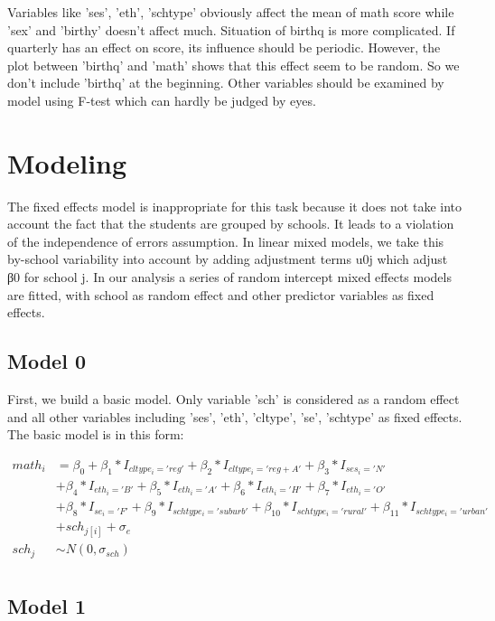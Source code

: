 \documentclass{article}
\begin{document}
Variables like 'ses', 'eth', 'schtype' obviously affect the mean of math score while 'sex' and 'birthy' doesn’t affect much. 
Situation of birthq is more complicated. If quarterly has an effect on score, its influence should be periodic. 
However, the plot between 'birthq' and 'math' shows that this effect seem to be random. So we don't include 'birthq' at the beginning.
Other variables should be examined by model using F-test which can hardly be judged by eyes.

\section{Modeling}

The fixed effects model is inappropriate for this task because it does not take into account the fact that the students are grouped 
by schools. It leads to a violation of the independence of errors assumption. In linear mixed models, we take this by-school 
variability into account by adding adjustment terms u0j which adjust β0 for school j. In our analysis a series of random intercept 
mixed effects models are fitted, with school as random effect and other predictor variables as fixed effects. 

\subsection{Model 0}



First, we build a basic model. Only variable 'sch' is considered as a random effect and all other variables including 'ses', 'eth', 
'cltype', 'se', 'schtype' as fixed effects. The basic model is in this form:

\begin{align*}
    math_i 
    &= \beta_0 + \beta_1*I_{cltype_i='reg'} + \beta_2*I_{cltype_i='reg+A'} + \beta_3*I_{ses_i='N'} \\
    &+ \beta_4*I_{eth_i='B'} + \beta_5*I_{eth_i='A'} + \beta_6*I_{eth_i='H'} + \beta_7*I_{eth_i='O'} \\
    &+ \beta_8*I_{se_i='F'} + \beta_9*I_{schtype_i='suburb'} + \beta_{10}*I_{schtype_i='rural'} + \beta_{11}*I_{schtype_i='urban'}\\
    &+ sch_{j[i]} + \sigma_e\\
    sch_j &\sim N(0, \sigma_{sch})\\
\end{align*}

\subsection{Model 1}
\end{document}
